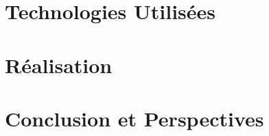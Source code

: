 \documentclass[a4paper,11pt,oneside]{report}
\begin{document}
\newpage

\chapter{Technologies Utilisées}

\newpage

\chapter{Réalisation}

\newpage

\chapter*{Conclusion et Perspectives}
\end{document}
